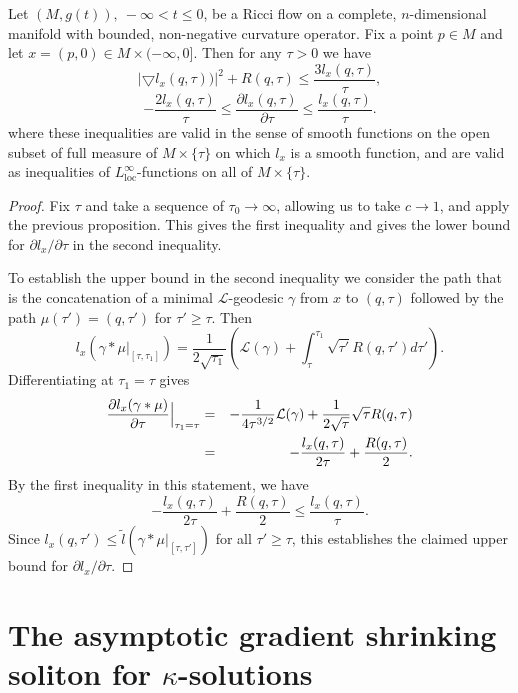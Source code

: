 \begin{corollary}\label{cor:l-function-gradient-bound}
\label{unianc}
Let $(M,g(t)),\ -\infty< t\le 0$, be a Ricci flow on a complete,
$n$-dimensional manifold with bounded, non-negative curvature
operator. Fix a point $p\in M$ and let $x=(p,0)\in M\times
(-\infty,0]$. Then for any $\tau>0$ we have
$$|\bigtriangledown l_x(q,\tau))|^{2} +R(q,\tau) \leq \frac{3l_x(q,\tau)}{\tau},$$
$$-\frac{2l_x(q,\tau)}{\tau}\le \frac{\partial l_x(q,\tau)}{\partial \tau}
\le \frac{l_x(q,\tau)}{\tau}.$$ where these inequalities are valid
in the sense of smooth functions on the open subset of full measure
of $M\times \{\tau\}$ on which $l_x$ is a smooth function, and are
valid as inequalities of $L^\infty_\mathrm{loc}$-functions on all of
$M\times \{\tau\}$.
\end{corollary}


\begin{proof}
Fix $\tau$ and take a sequence of $\tau_0\rightarrow \infty$,
allowing us to take $c\rightarrow 1$, and apply the previous
proposition. This gives the first inequality and gives the lower
bound for $\partial l_x/\partial \tau$ in the second inequality.

 To establish the upper bound in the second inequality we
consider the path that is the concatenation of a minimal ${\mathcal
L}$-geodesic $\gamma$ from $x$ to $(q,\tau)$ followed by the path
$\mu(\tau')=(q,\tau')$ for $\tau'\ge \tau$. Then
$$l_x(\gamma*\mu|_{[\tau,\tau_1]})=\frac{1}{2\sqrt{\tau_1}}\left({\mathcal L}(\gamma)
+\int_{\tau}^{\tau_1} \sqrt{\tau'}R(q,\tau')d\tau'\right).$$
Differentiating at $\tau_1=\tau$ gives
\begin{eqnarray*}
\frac{\partial
l_x(\gamma*\mu)}{\partial\tau}\Bigl|_{\tau_1=\tau}\Bigr. & = &
-\frac{1}{4\tau^{3/2}}{\mathcal L}(\gamma)+
\frac{1}{2\sqrt{\tau}}\sqrt{\tau}R(q,\tau) \\
& = & -\frac{l_x(q,\tau)}{2\tau}+\frac{R(q,\tau)}{2}.\end{eqnarray*}
By the first inequality in this statement, we have
$$-\frac{l_x(q,\tau)}{2\tau}+\frac{R(q,\tau)}{2}\le
 \frac{l_x(q,\tau)}{\tau}.$$ Since $l_x(q,\tau')\le \tilde l(\gamma*\mu|_{[\tau,\tau']})$
 for all $\tau'\ge \tau$, this establishes the claimed upper
bound for $\partial l_x/\partial \tau$.
\end{proof}

\section{The asymptotic gradient shrinking soliton for
$\kappa$-solutions}\label{sect9.2}





